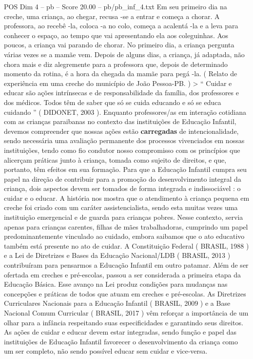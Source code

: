 \begin{textsample}{POS Dim 4 – pb – Score 20.00 – pb/pb\_inf\_4.txt}
Em seu primeiro dia na creche, uma criança, ao chegar, recusa -se a entrar e começa a chorar.
A professora, ao recebê -la, coloca -a no colo, começa a acalentá -la e a leva para conhecer o espaço, ao tempo que vai apresentando ela aos coleguinhas.
Aos poucos, a criança vai parando de chorar.
No primeiro dia, a criança pergunta várias vezes se a mamãe vem.
Depois de alguns dias, a criança, já adaptada, não chora mais e diz alegremente para a professora que, depois de determinado momento da rotina, é a hora da chegada da mamãe para pegá -la. ( Relato de experiência em uma creche do município de João Pessoa-PB. ) > “ Cuidar e educar são ações intrínsecas e de responsabilidade da família, dos professores e dos médicos.
Todos têm de saber que só se cuida educando e só se educa cuidando ” ( DIDONET, 2003 ).
Enquanto professores/as em interação cotidiana com as crianças paraibanas no contexto das instituições de Educação Infantil, devemos compreender que nossas ações estão \textbf{carregadas} de intencionalidade, sendo necessária uma avaliação permanente dos processos vivenciados em nossas instituições, tendo como fio condutor nosso compromisso com os princípios que alicerçam práticas junto à criança, tomada como sujeito de direitos, e que, portanto, têm efeitos em sua formação.
Para que a Educação Infantil cumpra seu papel na direção de contribuir para a promoção do desenvolvimento integral da criança, dois aspectos devem ser tomados de forma integrada e indissociável : o cuidar e o educar.
A história nos mostra que o atendimento à criança pequena em creche foi criado com um caráter assistencialista, sendo esta muitas vezes uma instituição emergencial e de guarda para crianças pobres.
Nesse contexto, servia apenas para crianças carentes, filhas de mães trabalhadoras, cumprindo um papel predominantemente vinculado ao cuidado, embora saibamos que o ato educativo também está presente no ato de cuidar.
A Constituição Federal ( BRASIL, 1988 ) e a Lei de Diretrizes e Bases da Educação Nacional/LDB ( BRASIL, 2013 ) contribuíram para pensarmos a Educação Infantil em outro patamar.
Além de ser ofertada em creches e pré-escolas, passou a ser considerada a primeira etapa da Educação Básica.
Esse avanço na Lei produz condições para mudanças nas concepções e práticas de todos que atuam em creches e pré-escolas.
As Diretrizes Curriculares Nacionais para a Educação Infantil ( BRASIL, 2009 ) e a Base Nacional Comum Curricular ( BRASIL, 2017 ) vêm reforçar a importância de um olhar para a infância respeitando suas especificidades e garantindo seus direitos.
As ações de cuidar e educar devem estar integradas, sendo função e papel das instituições de Educação Infantil favorecer o desenvolvimento da criança como um ser completo, não sendo possível educar sem cuidar e vice-versa.

\end{textsample}
